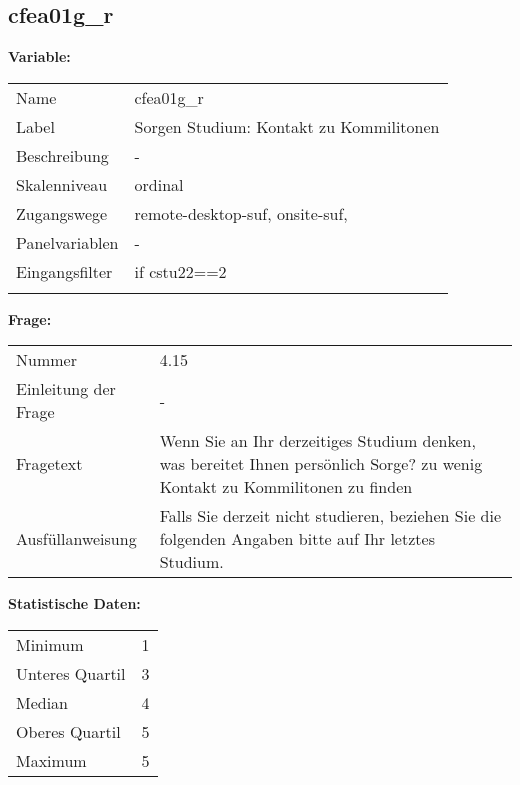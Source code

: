 	
	
	\subsection{cfea01g\_r}
	\label{subSection:cfea01g_r}

	\noindent\textbf{Variable:}\\
		\begin{tabular}{lL{11.3cm}}
			\label{tableVariable:cfea01g_r}
			Name & cfea01g\_r \\
			Label & Sorgen Studium: Kontakt zu Kommilitonen \\
			Beschreibung & - \\
			Skalenniveau & ordinal \\
			Zugangswege &
				remote-desktop-suf,
				onsite-suf,
 \\
			Panelvariablen & -
			 \\
			Eingangsfilter & if cstu22==2 \\
 \\
		\end{tabular}

		\vspace*{1 cm}
		\noindent\textbf{Frage:}\\
		\begin{tabular}{lL{11.3cm}}
			\label{tableQuestion:cfea01g_r}
			Nummer & 4.15 \\
			Einleitung der Frage & - \\
			Fragetext & Wenn Sie an Ihr derzeitiges Studium denken, was bereitet Ihnen persönlich Sorge?
zu wenig Kontakt zu Kommilitonen zu finden \\
			Ausfüllanweisung & Falls Sie derzeit nicht studieren, beziehen Sie die folgenden Angaben bitte auf Ihr letztes Studium. \\
		\end{tabular}


		\vspace*{1 cm}
		\noindent\textbf{Statistische Daten:}\\
			\begin{tabular}{ll}
				\label{tableStatistics:cfea01g_r}
					Minimum & 1 \\
					Unteres Quartil & 3 \\
					Median & 4 \\
					Oberes Quartil & 5 \\
					Maximum & 5 \\
			\end{tabular}




